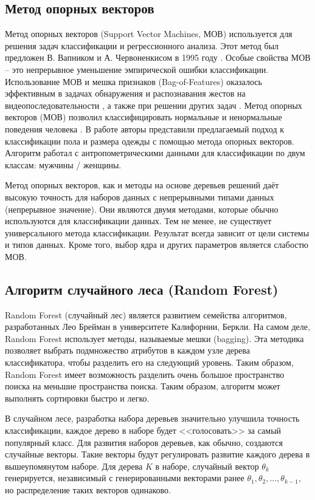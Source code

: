 \subsection{Метод опорных векторов}

Метод опорных векторов (Support Vector Machines, МОВ)  используется для решения задач классификации и регрессионного анализа. Этот метод был предложен В. Вапником и А. Червоненкисом в 1995 году \cite{Vapnik1995}. Особые свойства МОВ – это непрерывное уменьшение эмпирической ошибки классификации. Использование МОВ и мешка признаков (Bag-of-Features) оказалось эффективным в задачах обнаружения и распознавания жестов на видеопоследовательности \cite{Nasser2011, Dardas2010}, а также при решении других задач \cite{Jiang2007, Lazebnik2006}. Метод опорных векторов (МОВ) позволил классифицировать нормальные и ненормальные поведения человека \cite{Yogameena2010}. В работе \cite{Nguyen2015} авторы представили предлагаемый подход к классификации пола и размера одежды с помощью метода опорных векторов. Алгоритм работал с антропометрическими данными для классификации по двум классам: мужчины / женщины.

Метод опорных векторов, как и методы на основе деревьев решений даёт высокую точность для наборов данных с непрерывными типами данных (непрерывное значение). Они являются двумя методами, которые обычно используются для классификации данных. Тем не менее, не существует универсального метода классификации. Результат всегда зависит от цели системы и типов данных. Кроме того, выбор ядра и других параметров является  слабостю МОВ.

\subsection{Алгоритм случайного леса (Random Forest)}

Random Forest (случайный лес) \cite{Breiman2002, Breiman2001} является развитием семейства алгоритмов, разработанных Лео Брейман в университете Калифорнии, Беркли. На самом деле, Random Forest использует методы, называемые мешки (bagging). Эта методика позволяет выбрать подмножество атрибутов в каждом узле дерева классификатора, чтобы разделить его на следующий уровень. Таким образом, Random Forest имеет возможность разделить очень большое пространство поиска на меньшие пространства поиска. Таким образом, алгоритм может выполнять сортировки быстро и легко.

В случайном лесе, разработка набора деревьев значительно улучшила точность классификации, каждое дерево в наборе будет <<голосовать>> за самый популярный класс. Для развития наборов деревьев, как обычно, создаются случайные векторы. Такие векторы будут регулировать развитие каждого дерева в вышеупомянутом наборе. Для дерева $K$ в наборе, случайный вектор $\theta_k$  генерируется, независимый с генерированными векторами ранее $\theta_1, \theta_2, ..., \theta_{k-1}$, но распределение таких векторов одинаково. 

